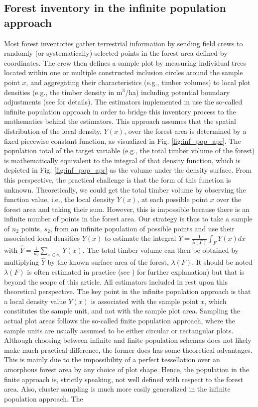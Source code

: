 \documentclass[article]{jss}
\begin{document}
\subsection{Forest inventory in the infinite population approach}

Most forest inventories gather terrestrial information by sending field crews to randomly (or systematically) selected points in the forest area defined by coordinates. The crew then defines a sample plot by measuring individual trees located within one or multiple constructed inclusion circles around the sample point $x$, and aggregating their characteristics (e.g., timber volumes) to local plot densities (e.g., the timber density in m$^3$/ha) including potential boundary adjustments (see \cite{mandallaz2008} for details). The estimators implemented in  use the so-called infinite population approach in order to bridge this inventory process to the mathematics behind the estimators. This approach assumes that the spatial distribution of the local density, $Y(x)$, over the forest area is determined by a fixed piecewise constant function, as visualized in Fig. \ref{fig:inf_pop_apr}. The population total of the target variable (e.g., the total timber volume of the forest) is mathematically equivalent to the integral of that density function, which is depicted in Fig. \ref{fig:inf_pop_apr} as the volume under the density surface. From this perspective, the practical challenge is that the form of this function is unknown. Theoretically, we could get the total timber volume by observing the function value, i.e., the local density $Y(x)$, at each possible point $x$ over the forest area and taking their sum. However, this is impossible because there is an infinite number of points in the forest area. Our strategy is thus to take a sample of $n_2$ points, $s_2$, from an infinite population of possible points and use their associated local densities $Y(x)$ to estimate the integral $Y=\frac{1}{\lambda(F)}\int_{F}Y(x)dx$ with $\hat{Y}=\frac{1}{n_2}\sum_{x \in s_2}Y(x)$.  The total timber volume can then be obtained by multiplying $\hat{Y}$ by the known surface area of the forest, $\lambda(F)$. It should be noted $\lambda(F)$ is often estimated in practice (see \cite{mandallaz2014}) for further explanation) but that is beyond the scope of this article. All estimators included in  rest upon this theoretical perspective. The key point in the infinite population approach is that a local density value $Y(x)$ is associated with the sample point $x$, which constitutes the sample unit, and not with the sample plot area. Sampling the actual plot areas follows the so-called finite population approach, where the sample units are usually assumed to be either circular or rectangular plots.  Although choosing between infinite and finite population schemas does not likely make much practical difference, the former does has some theoretical advantages.  This is mainly due to the impossibility of a perfect tessellation over an amorphous forest area by any choice of plot shape. Hence, the population in the finite approach is, strictly speaking, not well defined with respect to the forest area.  Also, cluster sampling is much more easily generalized in the infinite population approach. The 
\end{document}
